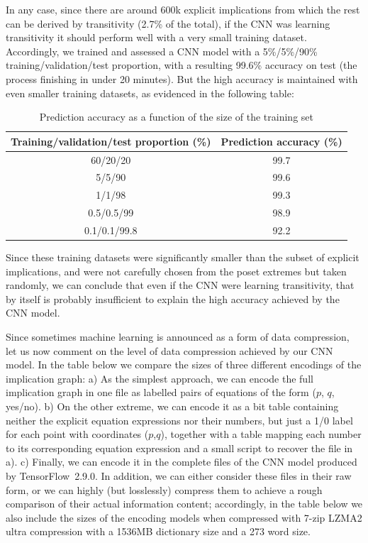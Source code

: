 \smallskip

In any case, since there are around 600k explicit implications from which the rest can be derived by transitivity (2.7\% of the total), if the CNN was learning transitivity it should perform well with a very small training dataset. Accordingly, we trained and assessed a CNN model with a 5\%/5\%/90\% training/validation/test proportion, with a resulting 99.6\% accuracy on test (the process finishing in under 20 minutes). But the high accuracy is maintained with even smaller training datasets, as evidenced in the following table:
\begin{table}[h]
\centering
\caption{Prediction accuracy as a function of the size of the training set}
\begin{tabular}{|c|c|}
\hline
  \textbf{Training/validation/test proportion (\%)} & \textbf{Prediction accuracy (\%)} \\\hline\hline
  60/20/20 & 99.7 \\\hline
  5/5/90 & 99.6 \\\hline
  1/1/98 & 99.3 \\\hline
  0.5/0.5/99 & 98.9 \\\hline
  0.1/0.1/99.8 & 92.2 \\
  \hline
\end{tabular}
\end{table}

\noindent Since these training datasets were significantly smaller than the subset of explicit implications, and were not carefully chosen from the poset extremes but taken randomly, we can conclude that even if the CNN were learning transitivity, that by itself is probably insufficient to explain the high accuracy achieved by the CNN model.

\smallskip

Since sometimes machine learning is announced as a form of data compression, let us now comment on the level of data compression achieved by our CNN model. In the table below we compare the sizes of three different encodings of the implication graph: a) As the simplest approach, we can encode the full implication graph in one file as labelled pairs of equations of the form ($p$, $q$, yes/no). b) On the other extreme, we can encode it as a bit table containing neither the explicit equation expressions nor their numbers, but just a 1/0 label for each point with coordinates ($p$,$q$), together with a table mapping each number to its corresponding equation expression and a small script to recover the file in a). c) Finally, we can encode it in the complete files of the CNN model produced by TensorFlow 2.9.0. In addition, we can either consider these files in their raw form, or we can highly (but losslessly) compress them to achieve a rough comparison of their actual information content; accordingly, in the table below we also include the sizes of the encoding models when compressed with 7-zip LZMA2 ultra compression with a 1536MB dictionary size and a 273 word size.

